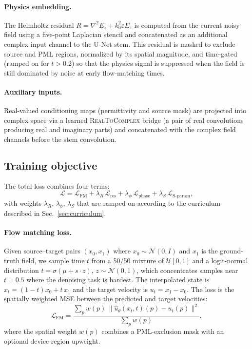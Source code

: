 \paragraph{Physics embedding.}
The Helmholtz residual $R = \nabla^2 E_z + k_0^2 \varepsilon E_z$ is computed from the
current noisy field using a five-point Laplacian stencil and concatenated as an additional complex input channel to the
U-Net stem. This residual is masked to exclude source and PML regions, normalized by its spatial magnitude, and
time-gated (ramped on for $t > 0.2$) so that the physics signal is suppressed when the field is still dominated by
noise at early flow-matching times.

\paragraph{Auxiliary inputs.}
Real-valued conditioning maps (permittivity and source mask) are projected into complex
space via a learned \textsc{RealToComplex} bridge (a pair of real convolutions producing real and imaginary parts) and
concatenated with the complex field channels before the stem convolution.

\subsection{Training objective}

The total loss combines four terms:
\begin{equation}
    \mathcal{L} = \mathcal{L}_\text{FM}
    + \lambda_R\,\mathcal{L}_\text{res}
    + \lambda_\phi\,\mathcal{L}_\text{phase}
    + \lambda_S\,\mathcal{L}_\text{S-param},
    \label{eq:total_loss}
\end{equation}
with weights $\lambda_R$, $\lambda_\phi$, $\lambda_S$ that are ramped on according to the curriculum described in
Sec.~\ref{sec:curriculum}.

\paragraph{Flow matching loss.}
Given source--target pairs $(x_0, x_1)$ where $x_0 \sim \mathcal{N}(0,I)$ and $x_1$ is the
ground-truth field, we sample time $t$ from a 50/50 mixture of $\mathcal{U}[0,1]$ and a logit-normal distribution
$t = \sigma(\mu + s\cdot z)$, $z \sim \mathcal{N}(0,1)$, which concentrates samples near $t = 0.5$ where the
denoising task is hardest. The interpolated state is $x_t = (1-t)x_0 + t\,x_1$ and the target velocity is
$u_t = x_1 - x_0$. The loss is the spatially weighted MSE between the predicted and target velocities:
\begin{equation}
    \mathcal{L}_\text{FM} = \frac{\sum_{p} w(p)\,\|\hat{u}_\theta(x_t,t)(p) - u_t(p)\|^2}{\sum_{p} w(p)},
    \label{eq:fm_loss_weighted}
\end{equation}
where the spatial weight $w(p)$ combines a PML-exclusion mask with an optional device-region upweight.

